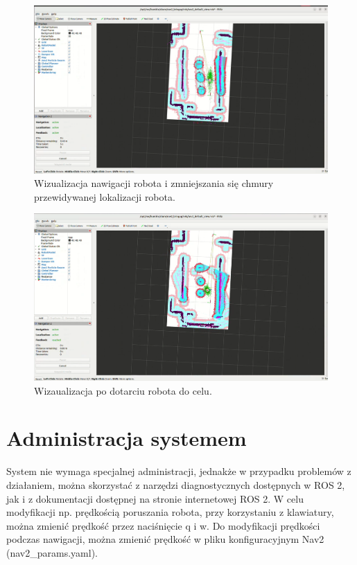 \documentclass[a4paper,twoside,12pt]{book}
\begin{document}
\begin{figure}[!hb]
	\centering
	\includegraphics[width=1\textwidth]{images/launch-nav5.png}
	\caption{Wizualizacja nawigacji robota i zmniejszania się chmury przewidywanej lokalizacji robota.}
	\label{fig:nav-map5}
\end{figure}
\newpage
\begin{figure}[!hb]
	\centering
	\includegraphics[width=1\textwidth]{images/launch-nav6.png}
	\caption{Wizaualizacja po dotarciu robota do celu.}
	\label{fig:nav-map6}
\end{figure}

\section{Administracja systemem}
System nie wymaga specjalnej administracji, jednakże w przypadku problemów z działaniem, można skorzystać z narzędzi diagnostycznych dostępnych w ROS 2, jak i z dokumentacji dostępnej na stronie internetowej ROS 2. W celu modyfikacji np. prędkością poruszania robota, przy korzystaniu z klawiatury, można zmienić prędkość przez naciśnięcie q i w. Do modyfikacji prędkości podczas nawigacji, można zmienić prędkość w pliku konfiguracyjnym Nav2 (nav2\_params.yaml).
\end{document}
